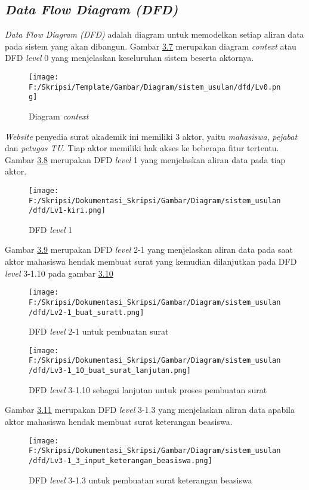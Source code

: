 \subsection{\textit{Data Flow Diagram (DFD)}}
\label{sec:data_flow_diagram}
\textit{Data Flow Diagram (DFD)} adalah diagram untuk memodelkan setiap aliran data pada sistem yang akan dibangun.
Gambar \hyperlink{data_flow}{3.7} merupakan diagram \textit{context} atau DFD \textit{level} 0 yang menjelaskan 
keseluruhan sistem beserta aktornya.

\begin{figure}[H]
	\centering
		\texttt{[image: F:/Skripsi/Template/Gambar/Diagram/sistem\_usulan/dfd/Lv0.png]}
	\caption{Diagram \textit{context}}
	\label{fig:data_flow}
\end{figure}

\textit{Website} penyedia surat akademik ini memiliki 3 aktor, yaitu \textit{mahasiswa}, \textit{pejabat} dan \textit{petugas TU}. Tiap aktor memiliki hak akses ke beberapa fitur tertentu. Gambar \hyperlink{level_1}{3.8} merupakan DFD \textit{level} 1 yang menjelaskan aliran data pada tiap aktor.

\begin{figure}[H]
	\centering
		\texttt{[image: F:/Skripsi/Dokumentasi\_Skripsi/Gambar/Diagram/sistem\_usulan/dfd/Lv1-kiri.png]}
	\caption{DFD \textit{level} 1}
	\label{fig:level_1}
\end{figure}

Gambar \hyperlink{level_2-1}{3.9} merupakan DFD \textit{level} 2-1 yang menjelaskan aliran data pada saat aktor mahasiswa hendak membuat surat yang kemudian dilanjutkan pada DFD \textit{level} 3-1.10 pada gambar \hyperlink{level_3-1.10}{3.10}

\begin{figure}[H]
	\centering
		\texttt{[image: F:/Skripsi/Dokumentasi\_Skripsi/Gambar/Diagram/sistem\_usulan/dfd/Lv2-1\_buat\_suratt.png]}
	\caption{DFD \textit{level} 2-1 untuk pembuatan surat}
	\label{fig:level_2-1}
\end{figure}

\begin{figure}[H]
	\centering
		\texttt{[image: F:/Skripsi/Dokumentasi\_Skripsi/Gambar/Diagram/sistem\_usulan/dfd/Lv3-1\_10\_buat\_surat\_lanjutan.png]}
	\caption{DFD \textit{level} 3-1.10 sebagai lanjutan untuk proses pembuatan surat}
	\label{fig:level_3-1.10}
\end{figure}

Gambar \hyperlink{level_3-1.3}{3.11} merupakan DFD \textit{level} 3-1.3 yang menjelaskan aliran data apabila aktor mahasiswa hendak membuat surat keterangan beasiswa.
\begin{figure}[H]
	\centering
		\texttt{[image: F:/Skripsi/Dokumentasi\_Skripsi/Gambar/Diagram/sistem\_usulan/dfd/Lv3-1\_3\_input\_keterangan\_beasiswa.png]}
	\caption{DFD \textit{level} 3-1.3 untuk pembuatan surat keterangan beasiswa}
	\label{fig:level_3-1.3}
\end{figure}

